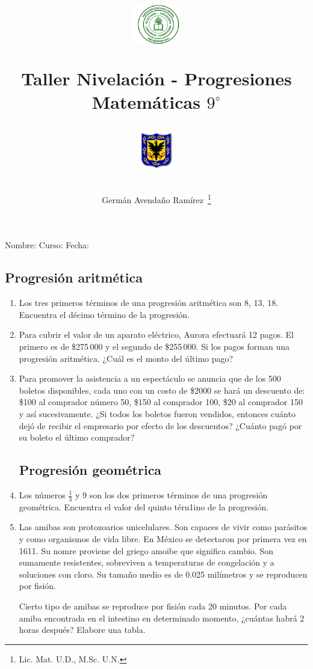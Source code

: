 \documentclass[twoside,letterpaper]{article}
\author{Germ\'an Avenda\~no Ram\'irez~\thanks{Lic. Mat. U.D., M.Sc. U.N.}}
\title{\begin{minipage}{.2\textwidth}
\includegraphics[height=1.75cm]{Images/logo-colegio.png}\end{minipage}
\begin{minipage}{.55\textwidth}
\begin{center}
Taller Nivelación - Progresiones\\
Matemáticas $9^{\circ}$
\end{center}
\end{minipage}\hfill
\begin{minipage}{.2\textwidth}
\includegraphics[height=1.75cm]{Images/logo-sed.png} 
\end{minipage}}
\date{}
\begin{document}
\maketitle
Nombre: \hrulefill Curso: \underline{\hspace*{44pt}} Fecha: \underline{\hspace*{2.5cm}}
\begin{multicols}{2}
\section*{Progresión aritmética}
\begin{enumerate}
\item Los tres primeros términos de una progresión aritmética son 8, 13, 18. Encuentra el décimo término de la progresión.
\item Para cubrir el valor de un aparato eléctrico, Aurora efectuará 12 pagos. El primero es de \$275\,000 y el segundo de \$255\,000. Si los pagos forman una progresión aritmética. ¿Cuál es el monto del último pago?
\item Para promover la asistencia a un espectáculo se anuncia que de los 500 boletos disponibles, cada uno con un costo de \$2000 se hará un descuento de: \$100 al comprador número 50, \$150 al comprador 100, \$20 al comprador 150 y así sucesivamente. ¿Si todos los boletos fueron vendidos, entonces cuánto dejó de recibir el empresario por efecto de los descuentos? ¿Cuánto pagó por su boleto el último comprador?
\section*{Progresión geométrica}
\item Los números $\frac{1}{3}$ y 9 son los dos primeros términos de una progresión geométrica. Encuentra el valor del quinto térn1ino de la progresión.
\item Las amibas son protozoarios unicelulares. Son capaces de vivir como parásitos y como organismos de vida libre. En México se detectaron por primera vez en 1611. Su nomre proviene del griego amoibe que significa cambio. Son sumamente resistentes, sobreviven a temperaturas de congelación y a soluciones con cloro. Su tamaño medio es de 0.025 milímetros y se reproducen por fisión.

Cierto tipo de amibas se reproduce por fisión cada 20 minutos. Por cada amiba encontrada en el intestino en determinado momento, ¿cuántas habrá 2 horas después? Elabore una tabla.
\end{enumerate}
\end{multicols}
\end{document}
